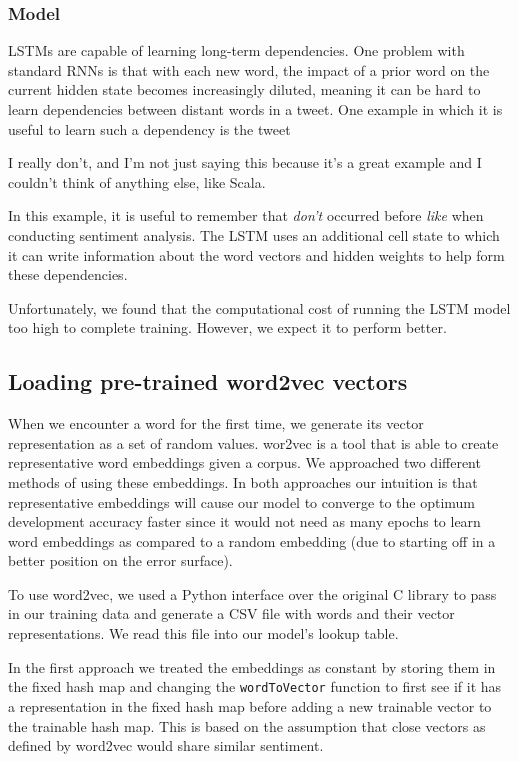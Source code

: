 \documentclass{article} %
\begin{document}
\subsubsection{Model}

LSTMs are capable of learning long-term dependencies. One problem with standard RNNs is that with each new word, the impact of a prior word on the current hidden state becomes increasingly diluted, meaning it can be hard to learn dependencies between distant words in a tweet. One example in which it is useful to learn such a dependency is the tweet

\begin{displayquote}
I really don't, and I'm not just saying this because it's a great example and I couldn't think of anything else, like Scala.
\end{displayquote}

In this example, it is useful to remember that \emph{don't} occurred before \emph{like} when conducting sentiment analysis. The LSTM uses an additional cell state to which it can write information about the word vectors and hidden weights to help form these dependencies.

Unfortunately, we found that the computational cost of running the LSTM model too high to complete training. However, we expect it to perform better.

\subsection{Loading pre-trained word2vec vectors}

When we encounter a word for the first time, we generate its vector representation as a set of random values. wor2vec is a tool that is able to create representative word embeddings given a corpus. We approached two different methods of using these embeddings. In both approaches our intuition is that representative embeddings will cause our model to converge to the optimum development accuracy faster since it would not need as many epochs to learn word embeddings as compared to a random embedding (due to starting off in a better position on the error surface).

To use word2vec, we used a Python interface over the original C library to pass in our training data and generate a CSV file with words and their vector representations. We read this file into our model's lookup table.

In the first approach we treated the embeddings as constant by storing them in the fixed hash map and changing the \texttt{wordToVector} function to first see if it has a representation in the fixed hash map before adding a new trainable vector to the trainable hash map. This is based on the assumption that close vectors as defined by word2vec would share similar sentiment.
\end{document}

